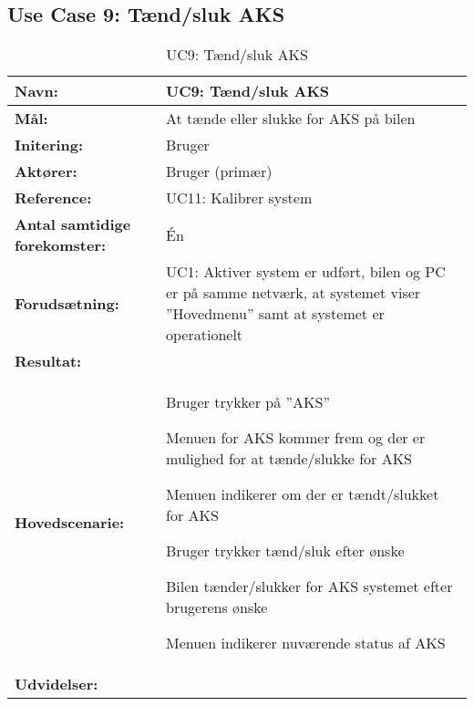 \subsection{Use Case 9: Tænd/sluk AKS}
\begin{table}[h]
\begin{tabularx}{\textwidth}{| L{3.3 cm} | Z |} \hline

\textbf{Navn:} 						& UC9: Tænd/sluk AKS \\ \hline
\textbf{Mål:}						& At tænde eller slukke for AKS på bilen \\ \hline
\textbf{Initering:}					& Bruger \\ \hline
\textbf{Aktører:} 					& Bruger (primær) \\ \hline  
\textbf{Reference:} 					& UC11: Kalibrer system\\ \hline
\textbf{Antal samtidige forekomster:} & Én \\ \hline
\textbf{Forudsætning:} 				& UC1: Aktiver system er udført, bilen og PC er på samme netværk, at systemet viser ''Hovedmenu'' samt at systemet er operationelt\\ \hline
\textbf{Resultat:}					&  \\ \hline
\textbf{Hovedscenarie:}				& 

\begin{packed_enum}
\item Bruger trykker på ''AKS'' 
\item Menuen for AKS kommer frem og der er mulighed for at tænde/slukke for AKS 
\item Menuen indikerer om der er tændt/slukket for AKS
\item Bruger trykker tænd/sluk efter ønske
\item Bilen tænder/slukker for AKS systemet efter brugerens ønske
\item Menuen indikerer nuværende status af AKS
\end{packed_enum} \\ \hline
\textbf{Udvidelser:}				&  
~
\\ \hline
\end{tabularx}
\caption{UC9: Tænd/sluk AKS}
\label{tbl:UC9}
\end{table}